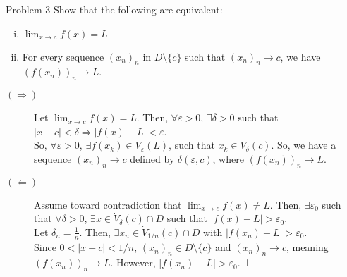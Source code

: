 \documentclass[10pt]{extarticle}
\begin{document}
  \begin{problem}{Problem 3}
    Show that the following are equivalent:
    \begin{enumerate}[(i)]
      \item $\lim_{x\rightarrow c} f(x) = L$
      \item For every sequence $(x_n)_n$ in $D\setminus \{c\}$ such that $(x_n)_n \rightarrow c$, we have $(f(x_n))_n \rightarrow L$. 
    \end{enumerate}
    \tcblower
    \begin{description}
      \item[$(\Rightarrow)$] Let $\lim_{x\rightarrow c} f(x) = L$. Then, $\forall \varepsilon > 0$, $\exists \delta > 0$ such that $|x-c| < \delta \Rightarrow |f(x) - L| < \varepsilon$.\\

        So, $\forall \varepsilon > 0$, $\exists f(x_k) \in V_{\varepsilon}(L)$, such that $x_k\in \dot{V}_{\delta}(c)$. So, we have a sequence $(x_n)_n \rightarrow c$ defined by $\delta(\varepsilon, c)$, where $\left(f(x_n)\right)_n \rightarrow L$.
      \item[$(\Leftarrow)$] Assume toward contradiction that $\lim_{x\rightarrow c} f(x) \neq L$. Then, $\exists \varepsilon_0$ such that $\forall \delta > 0$, $\exists x\in \dot{V}_{\delta}(c) \cap D$ such that $|f(x) - L| > \varepsilon_0$.\\

        Let $\delta_n = \frac{1}{n}$. Then, $\exists x_n\in \dot{V}_{1/n}(c) \cap D$ with $|f(x_n) - L| > \varepsilon_0$.\\

        Since $0 < |x-c| < 1/n$, $(x_n)_n \in D\setminus \{c\}$ and $(x_n)_n \rightarrow c$, meaning $(f(x_n))_n \rightarrow L$. However, $|f(x_n) - L| > \varepsilon_0$. $\bot$
    \end{description}
  \end{problem}
\end{document}
